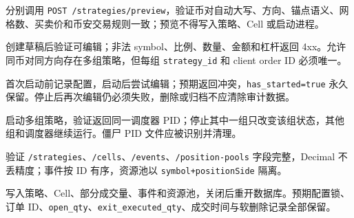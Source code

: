 
分别调用 \texttt{POST /strategies/preview}，验证币对自动大写、方向、锚点语义、网格数、买卖价和币安交易规则一致；预览不得写入策略、Cell 或启动进程。


创建草稿后验证可编辑；非法 symbol、比例、数量、金额和杠杆返回 4xx。允许同币对同方向存在多组策略，但每组 \texttt{strategy\_id} 和 client order ID 必须唯一。


首次启动前记录配置，启动后尝试编辑；预期返回冲突，\texttt{has\_started=true} 永久保留。停止后再次编辑仍必须失败，删除或归档不应清除审计数据。


启动多组策略，验证返回同一调度器 PID；停止其中一组只改变该组状态，其他组和调度器继续运行。僵尸 PID 文件应被识别并清理。


验证 \texttt{/strategies}、\texttt{/cells}、\texttt{/events}、\texttt{/position-pools} 字段完整，Decimal 不丢精度；事件按 ID 有序，资源池以 \texttt{symbol+positionSide} 隔离。


写入策略、Cell、部分成交量、事件和资源池，关闭后重开数据库。预期配置锁、订单 ID、\texttt{open\_qty}、\texttt{exit\_executed\_qty}、成交时间与软删除记录全部保留。
